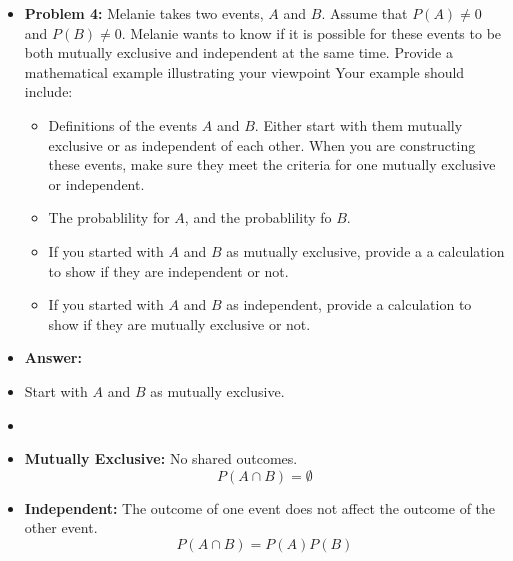 \documentclass{article}
\begin{document}
\begin{itemize}
\begin{itemize}
    \item[] \textbf{Problem 4:} Melanie takes two events, $A$ and $B$. Assume that $P(A) \neq 0$ and $P(B) \neq 0$. Melanie wants
    to know if it is possible for these events to be both mutually exclusive and independent at the same time. Provide a mathematical
    example illustrating your viewpoint Your example should include:
    \begin{itemize}
        \item Definitions of the events $A$ and $B$. Either start with them mutually exclusive or as independent of each other.
        When you are constructing these events, make sure they meet the criteria for one mutually exclusive or independent.
        \item The probablility for $A$, and the probablility fo $B$.
        \item If you started with $A$ and $B$ as mutually exclusive, provide a a calculation to show if they are independent or not.
        \item If you started with $A$ and $B$ as independent, provide a calculation to show if they are mutually exclusive or not.
    \end{itemize}
    \item[] \textbf{Answer:}
    \item[] Start with $A$ and $B$ as mutually exclusive.
    \item[] 
    \item[] \textbf{Mutually Exclusive:} No shared outcomes.
    \[
        P(A \cap B) = \emptyset 
    \]
    \newpage
    \item[] \textbf{Independent:} The outcome of one event does not affect the outcome of the other event.
    \[
        P(A \cap B) = P(A)P(B)
    \]
\end{itemize}
\end{itemize}
\end{document}
